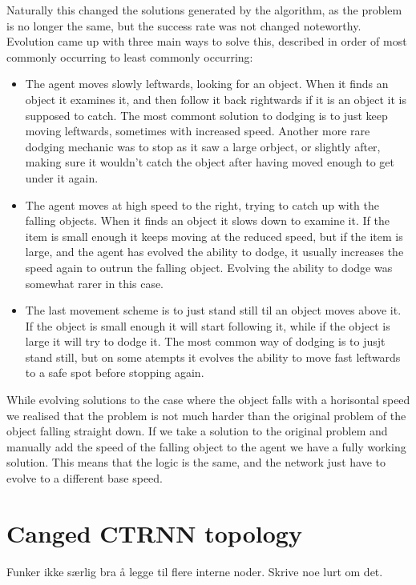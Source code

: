 \documentclass[a4paper,12pt]{article}
\begin{document}
Naturally this changed the solutions generated by the algorithm, as the problem is no longer the same, but the success rate was not changed noteworthy. Evolution came up with three main ways to solve this, described in order of most commonly occurring to least commonly occurring:
\begin{itemize}
\item{The agent moves slowly leftwards, looking for an object. When it finds an object it examines it, and then follow it back rightwards if it is an object it is supposed to catch. The most commont solution to dodging is to just keep moving leftwards, sometimes with increased speed. Another more rare dodging mechanic was to stop as it saw a large orbject, or slightly after, making sure it wouldn't catch the object after having moved enough to get under it again.}
\item{The agent moves at high speed to the right, trying to catch up with the falling objects. When it finds an object it slows down to examine it. If the item is small enough it keeps moving at the reduced speed, but if the item is large, and the agent has evolved the ability to dodge, it usually increases the speed again to outrun the falling object. Evolving the ability to dodge was somewhat rarer in this case.}
\item{The last movement scheme is to just stand still til an object moves above it. If the object is small enough it will start following it, while if the object is large it will try to dodge it. The most common way of dodging is to jusjt stand still, but on some atempts it evolves the ability to move fast leftwards to a safe spot before stopping again.}
\end{itemize}
While evolving solutions to the case where the object falls with a horisontal speed we realised that the problem is not much harder than the original problem of the object falling straight down. If we take a solution to the original problem and manually add the speed of the falling object to the agent we have a fully working solution. This means that the logic is the same, and the network just have to evolve to a different base speed.

\section{Canged CTRNN topology}
Funker ikke særlig bra å legge til flere interne noder. Skrive noe lurt om det.
\end{document}
